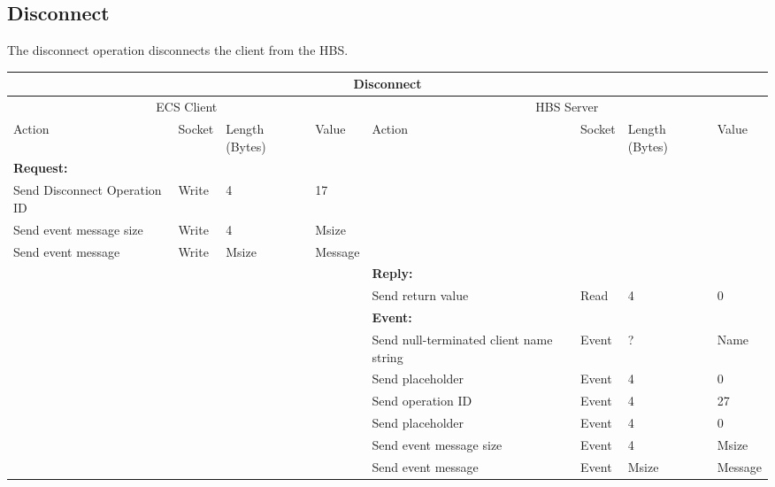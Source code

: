\newpage
\subsection{Disconnect}

The disconnect operation disconnects the client from the HBS.

\bigskip
\small
\begin{tabular}{|p{1.2in}|p{.4in}|p{.4in}|p{.4in}|p{1.2in}|p{.4in}|p{.4in}|p{.4in} |} \hline
\multicolumn{8}{|c|}{{\bf Disconnect}} \\ \hline
\multicolumn{4}{|c|}{ECS Client} & \multicolumn{4}{|c|}{HBS Server} \\ \hline
Action            & Socket & Length (Bytes) 
                                   & Value & Action       & Socket & Length (Bytes) & Value \\ \hline
\multicolumn{4}{|l}{{\bf Request:}}&\multicolumn{4}{|l|}{~} \\ \hline
Send
Disconnect Operation ID        & Write  & 4     & 17    &              &        &       &       \\ \hline
Send event message
 size             & Write  & 4     &  Msize &         &        &       &       \\ \hline
Send event message
                  & Write  &  Msize  &  Message &     &        &       &       \\ \hline
\multicolumn{4}{|l}{~}&\multicolumn{4}{|l|}{{\bf Reply:}} \\ \hline
                  &        &       &       & Send return
                                             value        & Read   &  4    & 0      \\ \hline
\multicolumn{4}{|l}{~}&\multicolumn{4}{|l|}{{\bf Event:}} \\ \hline
                  &        &       &       & Send null-terminated client
                                             name string  & Event  &  ?    & Name  \\ \hline
                  &        &       &       & Send placeholder  & Event  &   4   &  0    \\  \hline
                  &        &       &       & Send operation 
                                             ID           & Event  &   4   &  27   \\ \hline
                  &        &       &       & Send placeholder     & Event  &   4   &  0    \\ \hline
                  &        &       &       & Send event message
                                                  size    & Event  &   4   &  Msize \\ \hline
                  &        &       &       & Send event message
                                                          & Event  &  Msize&  Message  \\ \hline
\end{tabular}
\normalsize
\bigskip



